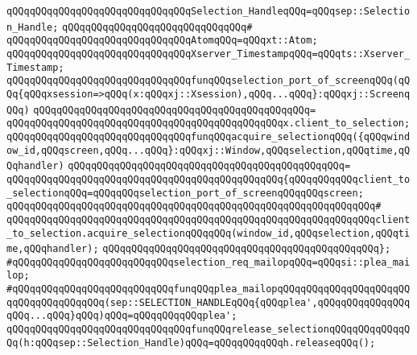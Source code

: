 \verb|qQQqqQQqqQQqqQQqqQQqqQQqqQQqqQQqSelection_HandleqQQq=qQQqsep::Selection_Handle;|\newline
\verb|qQQqqQQqqQQqqQQqqQQqqQQqqQQqqQQq#|\newline
\verb|qQQqqQQqqQQqqQQqqQQqqQQqqQQqqQQqAtomqQQq=qQQqxt::Atom;|\newline
\newline
\verb|qQQqqQQqqQQqqQQqqQQqqQQqqQQqqQQqXserver_TimestampqQQq=qQQqts::Xserver_Timestamp;|\newline
\newline
\verb|qQQqqQQqqQQqqQQqqQQqqQQqqQQqqQQqfunqQQqselection_port_of_screenqQQq(qQQq{qQQqxsession=>qQQq(x:qQQqxj::Xsession),qQQq...qQQq}:qQQqxj::ScreenqQQq)|\newline
\verb|qQQqqQQqqQQqqQQqqQQqqQQqqQQqqQQqqQQqqQQqqQQqqQQq=|\newline
\verb|qQQqqQQqqQQqqQQqqQQqqQQqqQQqqQQqqQQqqQQqqQQqqQQqx.client_to_selection;|\newline
\newline
\verb|qQQqqQQqqQQqqQQqqQQqqQQqqQQqqQQqfunqQQqacquire_selectionqQQq({qQQqwindow_id,qQQqscreen,qQQq...qQQq}:qQQqxj::Window,qQQqselection,qQQqtime,qQQqhandler)|\newline
\verb|qQQqqQQqqQQqqQQqqQQqqQQqqQQqqQQqqQQqqQQqqQQqqQQq=|\newline
\verb|qQQqqQQqqQQqqQQqqQQqqQQqqQQqqQQqqQQqqQQqqQQqqQQq{qQQqqQQqqQQqclient_to_selectionqQQq=qQQqqQQqselection_port_of_screenqQQqqQQqscreen;|\newline
\verb|qQQqqQQqqQQqqQQqqQQqqQQqqQQqqQQqqQQqqQQqqQQqqQQqqQQqqQQqqQQqqQQq#|\newline
\verb|qQQqqQQqqQQqqQQqqQQqqQQqqQQqqQQqqQQqqQQqqQQqqQQqqQQqqQQqqQQqqQQqclient_to_selection.acquire_selectionqQQqqQQq(window_id,qQQqselection,qQQqtime,qQQqhandler);|\newline
\verb|qQQqqQQqqQQqqQQqqQQqqQQqqQQqqQQqqQQqqQQqqQQqqQQq};|\newline
\newline
\verb|#qQQqqQQqqQQqqQQqqQQqqQQqqQQqselection_req_mailopqQQq=qQQqsi::plea_mailop;|\newline
\verb|#qQQqqQQqqQQqqQQqqQQqqQQqqQQqfunqQQqplea_mailopqQQqqQQqqQQqqQQqqQQqqQQqqQQqqQQqqQQqqQQq(sep::SELECTION_HANDLEqQQq{qQQqplea',qQQqqQQqqQQqqQQqqQQq...qQQq}qQQq)qQQq=qQQqqQQqqQQqplea';|\newline
\newline
\verb|qQQqqQQqqQQqqQQqqQQqqQQqqQQqqQQqfunqQQqrelease_selectionqQQqqQQqqQQqqQQq(h:qQQqsep::Selection_Handle)qQQq=qQQqqQQqqQQqh.releaseqQQq();|\newline
